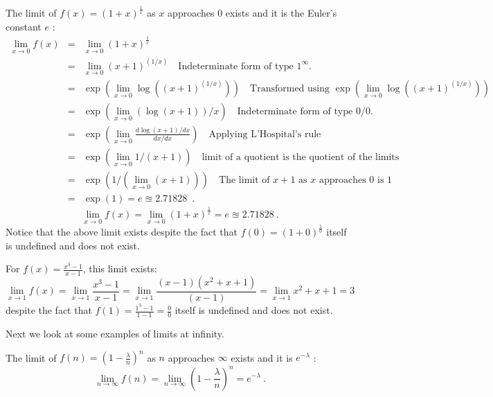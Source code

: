 \begin{example}\label{EX:LimitToE}
The limit of $f(x)=(1+x)^{\frac{1}{x}}$ as $x$ approaches $0$ exists and it is the Euler's constant $e$ :
\begin{eqnarray*}
\lim_{x \to 0} f(x) 
&=& \lim_{x \to 0} (1+x)^{\frac{1}{x}}\\ 
&=& \lim_{x \to 0} (x+1)^{(1/x)} \quad \text{Indeterminate form of type $1^\infty$.}\\
&=& \exp\left(\lim_{x\to 0} \log((x+1)^{(1/x)})\right) \quad \text{Transformed using $\exp(\lim_{x\to 0} \log((x+1)^{(1/x)}))$} \\
&=& \exp\left(\lim_{x\to 0} (\log(x+1))/x\right) \quad \text{Indeterminate form of type $0/0$.}\\
&=& \exp\left( \lim_{x\to 0} \frac{ d\log(x+1)/ dx}{ dx/ dx} \right) \quad \text{Applying L'Hospital's rule} \\
&=&  \exp\left(\lim_{x\to 0} 1/(x+1)\right) \quad \text{limit of a quotient is the quotient of the limits}\\
&=&  \exp\left(1/(\lim_{x \to 0} (x+1))\right) \quad \text{The limit of $x+1$ as $x$ approaches $0$ is $1$}\\
&=& \exp(1)=e \approxeq 2.71828 \enspace .
\end{eqnarray*}
\[
\lim_{x \to 0} f(x) = \lim_{x \to 0} (1+x)^{\frac{1}{x}} = e \approxeq 2.71828 \ .
\]
Notice that the above limit exists despite the fact that $f(0) = (1+0)^{\frac{1}{0}}$ itself is undefined and does not exist.
\end{example}

\begin{example}
For $f(x)=\frac{x^3-1}{x-1}$, this limit exists:
\[
\lim_{x \to 1} f(x) = \lim_{x \to 1} \frac{x^3-1}{x-1}
=  \lim_{x \to 1} \frac{(x-1)(x^2+x+1)}{(x-1)}
= \lim_{x \to 1} x^2+x+1 = 3 \,
\]
despite the fact that $f(1)=\frac{1^3-1}{1-1}=\frac{0}{0}$ itself is undefined and does not exist.
\end{example}

Next we look at some examples of limits at infinity.
\begin{example}\label{EX:LimitExpofLambda} 
The limit of $f(n)=\left( 1-\frac{\lambda}{n} \right)^n$ as $n$ approaches $\infty$ exists and it is $e^{-\lambda}$ :
\[
\lim_{n \to \infty} f(n) = \lim_{n \to \infty} \left( 1-\frac{\lambda}{n} \right)^n = e^{-\lambda} \ .
\]
\end{example}

